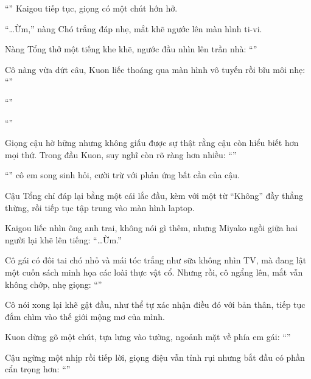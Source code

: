 \documentclass[../main.tex]{subfiles}
\begin{document}
``'' Kaigou tiếp tục, giọng có một chút hớn hở.

``\dots Ừm,'' nàng Chó trắng đáp nhẹ, mắt khẽ ngước lên màn hình ti-vi.

Nàng Tổng thở một tiếng khe khẽ, ngước đầu nhìn lên trần nhà: ``''

Cô nàng vừa dứt câu, Kuon liếc thoáng qua màn hình vô tuyến rồi bĩu môi nhẹ: ``''

``''

``''

Giọng cậu hờ hững nhưng không giấu được sự thật rằng cậu còn hiểu biết hơn mọi thứ. Trong đầu Kuon, suy nghĩ còn rõ ràng hơn nhiều: ``\textit{}''

``'' cô em song sinh hỏi, cười trừ với phản ứng bất cần của cậu.

Cậu Tổng chỉ đáp lại bằng một cái lắc đầu, kèm với một từ ``Không'' đầy thẳng thừng, rồi tiếp tục tập trung vào màn hình laptop.

Kaigou liếc nhìn ông anh trai, không nói gì thêm, nhưng Miyako ngồi giữa hai người lại khẽ lên tiếng: ``\dots Ừm.''

Cô gái có đôi tai chó nhỏ và mái tóc trắng như sữa không nhìn TV, mà đang lật một cuốn sách minh họa các loài thực vật cổ. Nhưng rồi, cô ngẩng lên, mắt vẫn không chớp, nhẹ giọng: ``''

Cô nói xong lại khẽ gật đầu, như thể tự xác nhận điều đó với bản thân, tiếp tục đắm chìm vào thế giới mộng mơ của mình.

Kuon dừng gõ một chút, tựa lưng vào tường, ngoảnh mặt về phía em gái: ``''

Cậu ngừng một nhịp rồi tiếp lời, giọng điệu vẫn tỉnh rụi nhưng bắt đầu có phần cẩn trọng hơn: ``''
\end{document}
